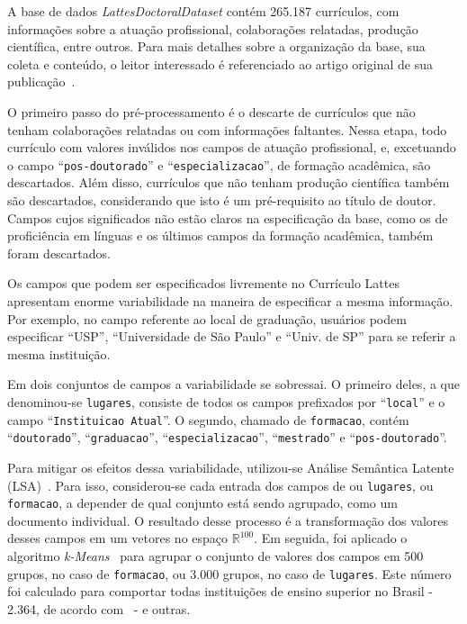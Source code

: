 \documentclass[12pt]{article}
\begin{document}
A base de dados \emph{LattesDoctoralDataset} contém 265.187 currículos, com informações sobre a atuação profissional, colaborações relatadas, produção científica, entre outros.
Para mais detalhes sobre a organização da base, sua coleta e conteúdo, o leitor interessado é referenciado ao artigo original de sua publicação~\cite{lattes-dataset}.

O primeiro passo do pré-processamento é o descarte de currículos que não tenham colaborações relatadas ou com informações faltantes.
Nessa etapa, todo currículo com valores inválidos nos campos de atuação profissional, e, excetuando o campo ``\texttt{pos-doutorado}'' e ``\texttt{especializacao}'', de formação acadêmica, são descartados.
Além disso, currículos que não tenham produção científica também são descartados, considerando que isto é um pré-requisito ao título de doutor.
Campos cujos significados não estão claros na especificação da base, como os de proficiência em línguas e os últimos campos da formação acadêmica, também foram descartados.

Os campos que podem ser especificados livremente no Currículo Lattes apresentam enorme variabilidade na maneira de especificar a mesma informação.
Por exemplo, no campo referente ao local de graduação, usuários podem especificar ``USP'', ``Universidade de São Paulo'' e ``Univ. de SP'' para se referir a mesma instituição.

Em dois conjuntos de campos a variabilidade se sobressai.
O primeiro deles, a que denominou-se \texttt{lugares}, consiste de todos os campos prefixados por ``\texttt{local}'' e o campo ``\texttt{Instituicao Atual}''.
O segundo, chamado de \texttt{formacao}, contém ``\texttt{doutorado}'', ``\texttt{graduacao}'', ``\texttt{especializacao}'', ``\texttt{mestrado}'' e ``\texttt{pos-doutorado}''.

Para mitigar os efeitos dessa variabilidade, utilizou-se Análise Semântica Latente (LSA)~\cite{lsa}.
Para isso, considerou-se cada entrada dos campos de ou \texttt{lugares}, ou \texttt{formacao}, a depender de qual conjunto está sendo agrupado, como um documento individual.
O resultado desse processo é a transformação dos valores desses campos em um vetores no espaço $\mathbb{R}^{100}$.
Em seguida, foi aplicado o algoritmo \emph{k-Means}~\cite{k-means} para agrupar o conjunto de valores dos campos em 500 grupos, no caso de \texttt{formacao}, ou 3.000 grupos, no caso de \texttt{lugares}.
Este número foi calculado para comportar todas instituições de ensino superior no Brasil - 2.364, de acordo com~\cite{censo-mec} - e outras.
\end{document}
